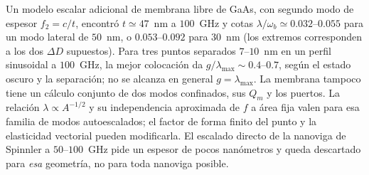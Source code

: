 \documentclass[11pt,a4paper]{article}
\newcommand{\wb}{\omega_b}
\begin{document}
Un modelo escalar adicional de membrana libre de GaAs, con segundo modo
de espesor $f_2=c/t$, encontró $t\simeq47$~nm a $100$~GHz y cotas
$\lambda/\wb\simeq0.032$--$0.055$ para un modo lateral de $50$~nm,
o $0.053$--$0.092$ para $30$~nm (los extremos corresponden a los dos
$\Delta D$ supuestos). Para tres puntos separados $7$--$10$~nm en un
perfil sinusoidal a $100$~GHz, la mejor colocación da
$g/\lambda_{\max}\sim0.4$--$0.7$, según el estado oscuro y la separación;
no se alcanza en general $g=\lambda_{\max}$. La membrana tampoco tiene
un cálculo conjunto de dos modos confinados, sus $Q_m$ y los puertos.
La relación $\lambda\propto A^{-1/2}$ y su independencia aproximada de
$f$ a área fija valen para esa familia de modos autoescalados;
el factor de forma finito del punto y la elasticidad vectorial pueden
modificarla. El escalado directo de la nanoviga de Spinnler a
$50$--$100$~GHz pide un espesor de pocos nanómetros y queda descartado
para \emph{esa} geometría, no para toda nanoviga posible.
\end{document}
